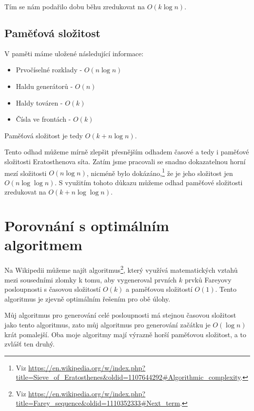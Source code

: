 \documentclass{article}
\begin{document}
Tím se nám podařilo dobu běhu zredukovat na $O\left(k\log{n}\right)$.

\subsection{Paměťová složitost}

V paměti máme uložené následující informace:

\begin{itemize}
    \item Prvočíselné rozklady - $O\left(n\log{n}\right)$
    \item Haldu generátorů - $O\left(n\right)$
    \item Haldy továren - $O\left(k\right)$
    \item Čísla ve frontách - $O\left(k\right)$
\end{itemize}

Paměťová složitost je tedy $O\left(k + n\log{n}\right)$.

Tento odhad můžeme mírně zlepšit přesnějším odhadem časové a tedy i paměťové složitosti Eratosthenova síta. Zatím jsme pracovali se snadno dokazatelnou horní mezí složitosti $O\left(n\log{n}\right)$, nicméně bylo dokázáno,\footnote{Viz \url{https://en.wikipedia.org/w/index.php?title=Sieve_of_Eratosthenes&oldid=1107644292\#Algorithmic_complexity}.} že je jeho složitost jen $O\left(n\log{\log{n}}\right)$. S využitím tohoto důkazu můžeme odhad paměťové složitosti zredukovat na $O\left(k + n\log{\log{n}}\right)$.

\section{Porovnání s optimálním algoritmem}

Na Wikipedii můžeme najít algoritmus\footnote{Viz \url{https://en.wikipedia.org/w/index.php?title=Farey_sequence&oldid=1110352333\#Next_term}.}, který využívá matematických vztahů mezi sousedními zlomky k tomu, aby vygeneroval prvních $k$ prvků Fareyovy posloupnosti s časovou složitostí $O\left(k\right)$ a paměťovou složitostí $O\left(1\right)$. Tento algoritmus je zjevně optimálním řešením pro obě úlohy.

Můj algoritmus pro generování celé posloupnosti má stejnou časovou složitost jako tento algoritmus, zato můj algoritmus pro generování začátku je $O\left(\log{n}\right)$ krát pomalejší. Oba moje algoritmy mají výrazně horší paměťovou složitost, a to zvlášť ten druhý.
\end{document}

